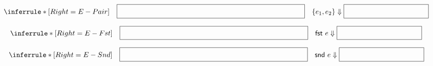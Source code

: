 \documentclass[12pt, dvipsnames]{exam}
\begin{document}
\thispagestyle{empty}

\theoremstyle{definition}
\newtheorem{definition}{Definition}[section]

\renewcommand{\solutiontitle}{\noindent\textbf{Explanation:}\enspace}

\newcommand{\eval}[2]{#1 \Downarrow #2}


\[
    \inferrule*[Right=E-Pair]{
        \quad\fbox{\phantom{{\Large This is my answer and This is my answer}}}\quad
    } {
        \eval{\{e_1, e_2\}}{\fbox{\phantom{{\Large This is my answer}}}}
    }
\]
\begin{solutionorbox}
    \vspace*{4em}
\end{solutionorbox}

\vspace{3em}

\[
    \inferrule*[Right=E-Fst]{
        \quad\fbox{\phantom{{\Large This is my answer and This is my answer}}}\quad
    } {
        \eval{\textsf{fst}\ e}{\fbox{\phantom{{\Large This is my answer}}}}
    }
\]
\begin{solutionorbox}
    \vspace*{4em}
\end{solutionorbox}

\vspace{3em}

\[
    \inferrule*[Right=E-Snd]{
        \quad\fbox{\phantom{{\Large This is my answer and This is my answer}}}\quad
    } {
        \eval{\textsf{snd}\ e}{\fbox{\phantom{{\Large This is my answer}}}}
    }
\]
\begin{solutionorbox}
    \vspace*{4em}
\end{solutionorbox}
\end{document}
